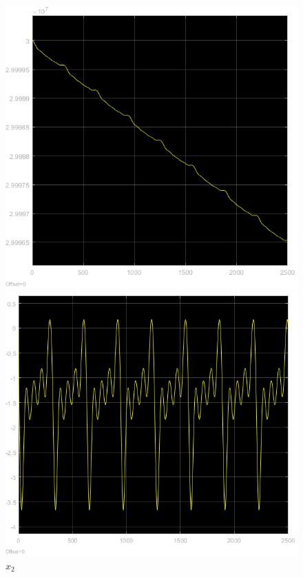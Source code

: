 \documentclass{article}
\begin{document}
\begin{figure}[!h]
   \begin{minipage}{0.5\textwidth}
     \centering
     \includegraphics[width=1.06\textwidth]{grafici/x1_2.png}
     \caption*{$x_1$ }
   \end{minipage}\hfill
    \begin{minipage}{0.5\textwidth}
     \centering
     \includegraphics[width=1.1\textwidth]{grafici/x2_2.png}
     \caption*{$x_2$}
   \end{minipage}\hfill
\end{figure}
\end{document}
